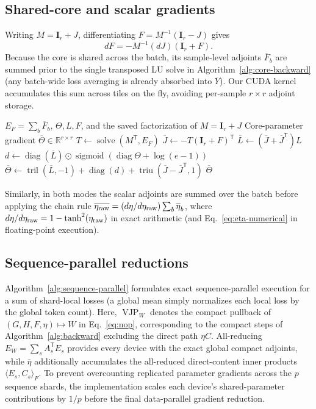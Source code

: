 \documentclass[10pt,twocolumn]{article}
\let\draftsmall\small
\renewcommand{\small}{\draftsmall\fontsize{9}{10}\selectfont}
\newcommand{\R}{\mathbb{R}}
\newcommand{\I}{\mathbf{I}}
\newcommand{\T}{\mathsf{T}}
\newcommand{\diag}{\operatorname{diag}}
\newcommand{\tril}{\operatorname{tril}}
\newcommand{\triu}{\operatorname{triu}}
\newcommand{\Solve}{\operatorname{solve}}
\begin{document}
\subsection{Shared-core and scalar gradients}
\label{app:core-backward}

Writing $M=\I_r+J$, differentiating $F=M^{-1}(\I_r-J)$ gives
\begin{equation}
 dF=-M^{-1}(dJ)(\I_r+F).
 \label{eq:core-differential}
\end{equation}
Because the core is shared across the batch, its sample-level adjoints
$\overline F_b$ are summed prior to the single transposed LU solve in
Algorithm~\ref{alg:core-backward} (any batch-wide loss averaging is already
absorbed into $\overline Y$).
Our CUDA kernel accumulates this sum across tiles on the fly, avoiding
per-sample $r\times r$ adjoint storage.

\begin{algorithm}[!ht]
\caption{Shared-core backward (once per head, Equilibrium only)}
\label{alg:core-backward}
\small
\begin{algorithmic}[1]
\Require $E_F=\sum_b\overline F_b$, $\Theta,L,F$, and the saved factorization of $M=\I_r+J$
\Ensure Core-parameter gradient $\overline\Theta\in\R^{r\times r}$
\State $T\gets\Solve(M^\T,E_F)$ 
\State $\overline J\gets-T(\I_r+F)^\T$
\State $\overline L\gets(\overline J+\overline J^\T)L$
\State $d\gets\diag(\overline L)\odot\operatorname{sigmoid}(\diag\Theta+\log(e-1))$
\State $\overline\Theta\gets\tril(\overline L,-1)+\diag(d)+\triu(\overline J-\overline J^\T,1)$
\State \Return $\overline\Theta$
\end{algorithmic}
\end{algorithm}

Similarly, in both modes the scalar adjoints are summed over the batch before
applying the chain rule
$\overline{\eta_{\rm raw}}=(d\eta/d\eta_{\rm raw})\sum_b\overline\eta_b$,
where $d\eta/d\eta_{\rm raw}=1-\tanh^2(\eta_{\rm raw})$ in exact arithmetic
(and Eq.~\eqref{eq:eta-numerical} in floating-point execution).

\subsection{Sequence-parallel reductions}
\label{app:parallel}

Algorithm~\ref{alg:sequence-parallel} formulates exact sequence-parallel
execution for a sum of shard-local losses (a global mean simply normalizes
each local loss by the global token count).
Here, $\operatorname{VJP}_W$ denotes the compact pullback of
$(G,H,F,\eta)\mapsto W$ in Eq.~\eqref{eq:nop}, corresponding to the compact
steps of Algorithm~\ref{alg:backward} excluding the direct path $\eta C$.
All-reducing $E_W=\sum_s A_s^\T E_s$ provides every device with the exact
global compact adjoints, while $\overline\eta$ additionally accumulates the
all-reduced direct-content inner products $\langle E_s,C_s\rangle_F$.
To prevent overcounting replicated parameter gradients across the $p$
sequence shards, the implementation scales each device's shared-parameter
contributions by $1/p$ before the final data-parallel gradient reduction.
\end{document}
